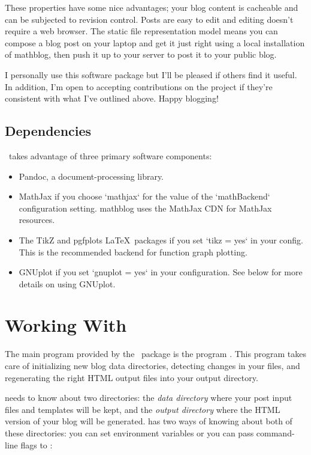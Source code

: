 \documentclass[11pt, letterpaper, oneside, titlepage]{book}
\begin{document}
These properties have some nice advantages; your blog content is
cacheable and can be subjected to revision control.  Posts are easy to
edit and editing doesn't require a web browser.  The static file
representation model means you can compose a blog post on your laptop
and get it just right using a local installation of mathblog, then
push it up to your server to post it to your public blog.

I personally use this software package but I'll be pleased if others
find it useful.  In addition, I'm open to accepting contributions on
the project if they're consistent with what I've outlined above.
Happy blogging!

\section{Dependencies}

\mathblog\ takes advantage of three primary software components:

\begin{itemize}
\item{Pandoc, a document-processing library.}
\item{MathJax if you choose `mathjax` for the value of the
  `mathBackend` configuration setting.  mathblog uses the MathJax CDN
  for MathJax resources.}
\item{The TikZ and pgfplots \LaTeX\ packages if you set `tikz = yes`
  in your config.  This is the recommended backend for function graph
  plotting.}
\item{GNUplot if you set `gnuplot = yes` in your configuration.  See
  below for more details on using GNUplot.}
\end{itemize}

\chapter{Working With \mathblog}

The main program provided by the \mathblog\ package is the program
.  This program takes care of initializing new blog data
directories, detecting changes in your files, and regenerating the
right HTML output files into your output directory.

 needs to know about two directories: the \textit{data
  directory} where your post input files and templates will be kept,
and the \textit{output directory} where the HTML version of your blog
will be generated.   has two ways of knowing about both of
these directories: you can set environment variables or you can pass
command-line flags to :
\end{document}
